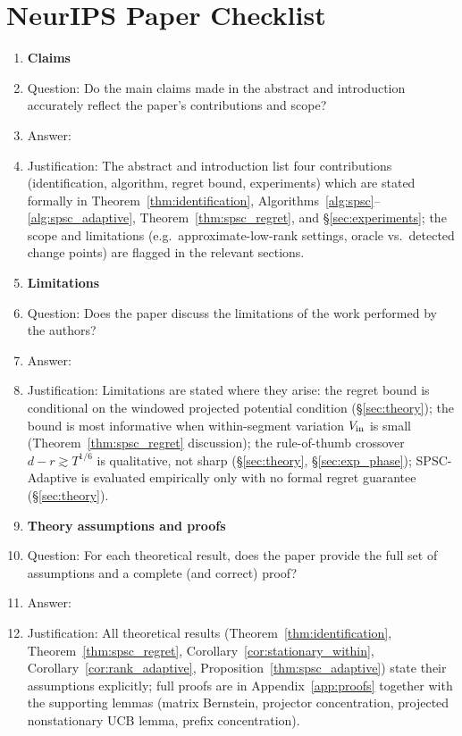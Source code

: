 \section*{NeurIPS Paper Checklist}

\begin{enumerate}

\item {\bf Claims}
    \item[] Question: Do the main claims made in the abstract and introduction accurately reflect the paper's contributions and scope?
    \item[] Answer: \answerYes{}
    \item[] Justification: The abstract and introduction list four contributions (identification, algorithm, regret bound, experiments) which are stated formally in Theorem~\ref{thm:identification}, Algorithms~\ref{alg:spsc}--\ref{alg:spsc_adaptive}, Theorem~\ref{thm:spsc_regret}, and \S\ref{sec:experiments}; the scope and limitations (e.g.\ approximate-low-rank settings, oracle vs.\ detected change points) are flagged in the relevant sections.

\item {\bf Limitations}
    \item[] Question: Does the paper discuss the limitations of the work performed by the authors?
    \item[] Answer: \answerYes{}
    \item[] Justification: Limitations are stated where they arise: the regret bound is conditional on the windowed projected potential condition (\S\ref{sec:theory}); the bound is most informative when within-segment variation $V_{\rm in}$ is small (Theorem~\ref{thm:spsc_regret} discussion); the rule-of-thumb crossover $d-r\gtrsim T^{1/6}$ is qualitative, not sharp (\S\ref{sec:theory}, \S\ref{sec:exp_phase}); SPSC-Adaptive is evaluated empirically only with no formal regret guarantee (\S\ref{sec:theory}).

\item {\bf Theory assumptions and proofs}
    \item[] Question: For each theoretical result, does the paper provide the full set of assumptions and a complete (and correct) proof?
    \item[] Answer: \answerYes{}
    \item[] Justification: All theoretical results (Theorem~\ref{thm:identification}, Theorem~\ref{thm:spsc_regret}, Corollary~\ref{cor:stationary_within}, Corollary~\ref{cor:rank_adaptive}, Proposition~\ref{thm:spsc_adaptive}) state their assumptions explicitly; full proofs are in Appendix~\ref{app:proofs} together with the supporting lemmas (matrix Bernstein, projector concentration, projected nonstationary UCB lemma, prefix concentration).


\end{enumerate}
